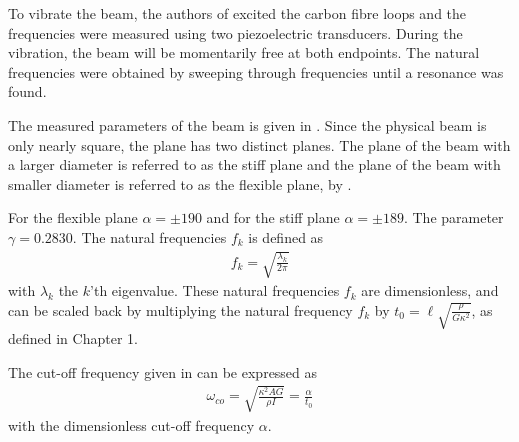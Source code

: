 \documentclass[../../main.tex]{subfiles}
\begin{document}
To vibrate the beam, the authors of \cite{SP06} excited the carbon fibre loops and the frequencies were measured using two piezoelectric transducers. During the vibration, the beam will be momentarily free at both endpoints. The natural frequencies were obtained by sweeping through frequencies until a resonance was found.

The measured parameters of the beam is given in \cite{SP06}. Since the physical beam is only nearly square, the plane has two distinct planes. The plane of the beam with a larger diameter is referred to as the stiff plane and the plane of the beam with smaller diameter is referred to as the flexible plane, by \cite{SP06}.

For the flexible plane $\alpha = \pm 190$ and for the stiff plane $\alpha = \pm 189$. The parameter $\gamma = 0.2830$. The natural frequencies $f_k$ is defined as 
\begin{eqnarray*}
	f_k = \sqrt{\frac{\lambda_k}{2\pi}}
\end{eqnarray*} with $\lambda_k$ the $k$'th eigenvalue. These natural frequencies $f_k$ are dimensionless, and can be scaled back by multiplying the natural frequency $f_k$ by $t_0=\ell\sqrt{\frac{\rho}{G\kappa^2}}$, as defined in Chapter 1.

The cut-off frequency given in \cite{SP06} can be expressed as
\begin{eqnarray*}
	\omega_{co} = \sqrt{\frac{\kappa^2 A G}{\rho I}} = \frac{\alpha}{t_0}
\end{eqnarray*}
with the dimensionless cut-off frequency $\alpha$.
\end{document}
